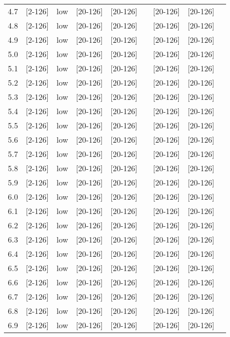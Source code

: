 \documentclass{article}
\begin{document}
\begin{tabular}{| l | l | l | l | l | l | l | l | l |}
      4.7 & [2-126] & low & [20-126] & [20-126] &  & [20-126] & [20-126] &\\
      4.8 & [2-126] & low & [20-126] & [20-126] &  & [20-126] & [20-126] &\\
      4.9 & [2-126] & low & [20-126] & [20-126] &  & [20-126] & [20-126] &\\
      5.0 & [2-126] & low & [20-126] & [20-126] &  & [20-126] & [20-126] &\\
      5.1 & [2-126] & low & [20-126] & [20-126] &  & [20-126] & [20-126] &\\
      5.2 & [2-126] & low & [20-126] & [20-126] &  & [20-126] & [20-126] &\\
      5.3 & [2-126] & low & [20-126] & [20-126] &  & [20-126] & [20-126] &\\
      5.4 & [2-126] & low & [20-126] & [20-126] &  & [20-126] & [20-126] &\\
      5.5 & [2-126] & low & [20-126] & [20-126] &  & [20-126] & [20-126] &\\
      5.6 & [2-126] & low & [20-126] & [20-126] &  & [20-126] & [20-126] &\\
      5.7 & [2-126] & low & [20-126] & [20-126] &  & [20-126] & [20-126] &\\
      5.8 & [2-126] & low & [20-126] & [20-126] &  & [20-126] & [20-126] &\\
      5.9 & [2-126] & low & [20-126] & [20-126] &  & [20-126] & [20-126] &\\
      6.0 & [2-126] & low & [20-126] & [20-126] &  & [20-126] & [20-126] &\\
      6.1 & [2-126] & low & [20-126] & [20-126] &  & [20-126] & [20-126] &\\
      6.2 & [2-126] & low & [20-126] & [20-126] &  & [20-126] & [20-126] &\\
      6.3 & [2-126] & low & [20-126] & [20-126] &  & [20-126] & [20-126] &\\
      6.4 & [2-126] & low & [20-126] & [20-126] &  & [20-126] & [20-126] &\\
      6.5 & [2-126] & low & [20-126] & [20-126] &  & [20-126] & [20-126] &\\
      6.6 & [2-126] & low & [20-126] & [20-126] &  & [20-126] & [20-126] &\\
      6.7 & [2-126] & low & [20-126] & [20-126] &  & [20-126] & [20-126] &\\
      6.8 & [2-126] & low & [20-126] & [20-126] &  & [20-126] & [20-126] &\\
      6.9 & [2-126] & low & [20-126] & [20-126] &  & [20-126] & [20-126] &\\

\end{tabular}
\end{document}
